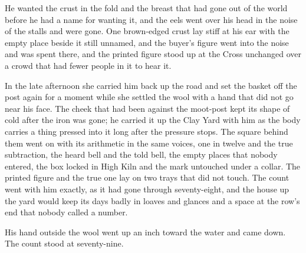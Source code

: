 He wanted the crust in the fold and the breast that had gone out of the world before he had a name for wanting it, and the eels went over his head in the noise of the stalls and were gone. One brown-edged crust lay stiff at his ear with the empty place beside it still unnamed, and the buyer's figure went into the noise and was spent there, and the printed figure stood up at the Cross unchanged over a crowd that had fewer people in it to hear it.
\scenebreak

In the late afternoon she carried him back up the road and set the basket off the post again for a moment while she settled the wool with a hand that did not go near his face. The cheek that had been against the moot-post kept its shape of cold after the iron was gone; he carried it up the Clay Yard with him as the body carries a thing pressed into it long after the pressure stops. The square behind them went on with its arithmetic in the same voices, one in twelve and the true subtraction, the heard bell and the told bell, the empty places that nobody entered, the box locked in High Kiln and the mark untouched under a collar. The printed figure and the true one lay on two trays that did not touch. The count went with him exactly, as it had gone through seventy-eight, and the house up the yard would keep its days badly in loaves and glances and a space at the row's end that nobody called a number.

His hand outside the wool went up an inch toward the water and came down. The count stood at seventy-nine.
